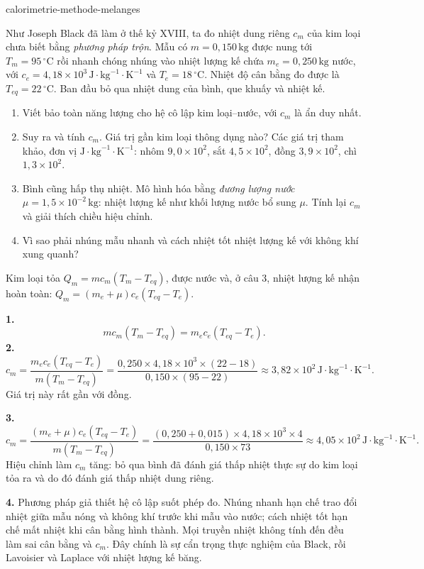 \begin{exo}{calorimetrie-methode-melanges}

Như Joseph Black đã làm ở thế kỷ XVIII, ta đo nhiệt dung riêng $c_m$ của kim loại chưa biết bằng \emph{phương pháp trộn}. Mẫu có $m=0{,}150\,\text{kg}$ được nung tới $T_m=95\,^\circ\text{C}$ rồi nhanh chóng nhúng vào nhiệt lượng kế chứa $m_e=0{,}250\,\text{kg}$ nước, với $c_e=4{,}18\times10^3\,\text{J}\!\cdot\!\text{kg}^{-1}\!\cdot\!\text{K}^{-1}$ và $T_e=18\,^\circ\text{C}$. Nhiệt độ cân bằng đo được là $T_{eq}=22\,^\circ\text{C}$. Ban đầu bỏ qua nhiệt dung của bình, que khuấy và nhiệt kế.
\begin{enumerate}
  \item Viết bảo toàn năng lượng cho hệ cô lập kim loại–nước, với $c_m$ là ẩn duy nhất.
  \item Suy ra và tính $c_m$. Giá trị gần kim loại thông dụng nào? Các giá trị tham khảo, đơn vị $\text{J}\!\cdot\!\text{kg}^{-1}\!\cdot\!\text{K}^{-1}$: nhôm $9{,}0\times10^2$, sắt $4{,}5\times10^2$, đồng $3{,}9\times10^2$, chì $1{,}3\times10^2$.
  \item Bình cũng hấp thụ nhiệt. Mô hình hóa bằng \emph{đương lượng nước} $\mu=1{,}5\times10^{-2}\,\text{kg}$: nhiệt lượng kế như khối lượng nước bổ sung $\mu$. Tính lại $c_m$ và giải thích chiều hiệu chỉnh.
  \item Vì sao phải nhúng mẫu nhanh và cách nhiệt tốt nhiệt lượng kế với không khí xung quanh?
\end{enumerate}
\begin{indication}
Kim loại tỏa $Q_m=mc_m(T_m-T_{eq})$, được nước và, ở câu 3, nhiệt lượng kế nhận hoàn toàn: $Q_m=(m_e+\mu)c_e(T_{eq}-T_e)$.
\end{indication}
\begin{solution}
\textbf{1.}
\[
mc_m(T_m-T_{eq})=m_ec_e(T_{eq}-T_e).
\]
\textbf{2.}
\[
c_m=\frac{m_ec_e(T_{eq}-T_e)}{m(T_m-T_{eq})}
=\frac{0{,}250\times4{,}18\times10^3\times(22-18)}{0{,}150\times(95-22)}
\approx3{,}82\times10^2\,\text{J}\!\cdot\!\text{kg}^{-1}\!\cdot\!\text{K}^{-1}.
\]
Giá trị này rất gần với đồng.

\textbf{3.}
\[
c_m=\frac{(m_e+\mu)c_e(T_{eq}-T_e)}{m(T_m-T_{eq})}
=\frac{(0{,}250+0{,}015)\times4{,}18\times10^3\times4}{0{,}150\times73}
\approx4{,}05\times10^2\,\text{J}\!\cdot\!\text{kg}^{-1}\!\cdot\!\text{K}^{-1}.
\]
Hiệu chỉnh làm $c_m$ tăng: bỏ qua bình đã đánh giá thấp nhiệt thực sự do kim loại tỏa ra và do đó đánh giá thấp nhiệt dung riêng.

\textbf{4.} Phương pháp giả thiết hệ cô lập suốt phép đo. Nhúng nhanh hạn chế trao đổi nhiệt giữa mẫu nóng và không khí trước khi mẫu vào nước; cách nhiệt tốt hạn chế mất nhiệt khi cân bằng hình thành. Mọi truyền nhiệt không tính đến đều làm sai cân bằng và $c_m$. Đây chính là sự cẩn trọng thực nghiệm của Black, rồi Lavoisier và Laplace với nhiệt lượng kế băng.
\end{solution}
\end{exo}

